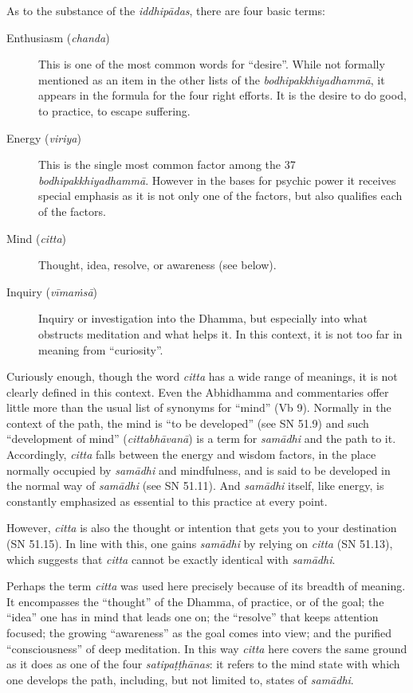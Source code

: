 \documentclass[12pt,openany]{book}%
\begin{document}
As to the substance of the \textit{\textsanskrit{iddhipādas}}, there are four basic terms:

\begin{description}%
\item[Enthusiasm (\textit{chanda})] This is one of the most common words for “desire”. While not formally mentioned as an item in the other lists of the \textit{\textsanskrit{bodhipakkhiyadhammā}}, it appears in the formula for the four right efforts. It is the desire to do good, to practice, to escape suffering.%
\item[Energy (\textit{viriya})] This is the single most common factor among the 37 \textit{\textsanskrit{bodhipakkhiyadhammā}}. However in the bases for psychic power it receives special emphasis as it is not only one of the factors, but also qualifies each of the factors.%
\item[Mind (\textit{citta})] Thought, idea, resolve, or awareness (see below).%
\item[Inquiry (\textit{\textsanskrit{vīmaṁsā}})] Inquiry or investigation into the Dhamma, but especially into what obstructs meditation and what helps it. In this context, it is not too far in meaning from “curiosity”.%
\end{description}

Curiously enough, though the word \textit{citta} has a wide range of meanings, it is not clearly defined in this context. Even the Abhidhamma and commentaries offer little more than the usual list of synonyms for “mind” (Vb 9). Normally in the context of the path, the mind is “to be developed” (see SN 51.9) and such “development of mind” (\textit{\textsanskrit{cittabhāvanā}}) is a term for \textit{\textsanskrit{samādhi}} and the path to it. Accordingly, \textit{citta} falls between the energy and wisdom factors, in the place normally occupied by \textit{\textsanskrit{samādhi}} and mindfulness, and is said to be developed in the normal way of \textit{\textsanskrit{samādhi}} (see SN 51.11). And \textit{\textsanskrit{samādhi}} itself, like energy, is constantly emphasized as essential to this practice at every point.

However, \textit{citta} is also the thought or intention that gets you to your destination (SN 51.15). In line with this, one gains \textit{\textsanskrit{samādhi}} by relying on \textit{citta} (SN 51.13), which suggests that \textit{citta} cannot be exactly identical with \textit{\textsanskrit{samādhi}}.

Perhaps the term \textit{citta} was used here precisely because of its breadth of meaning. It encompasses the “thought” of the Dhamma, of practice, or of the goal; the “idea” one has in mind that leads one on; the “resolve” that keeps attention focused; the growing “awareness” as the goal comes into view; and the purified “consciousness” of deep meditation. In this way \textit{citta} here covers the same ground as it does as one of the four \textit{\textsanskrit{satipaṭṭhānas}}: it refers to the mind state with which one develops the path, including, but not limited to, states of \textit{\textsanskrit{samādhi}}.
\end{document}
